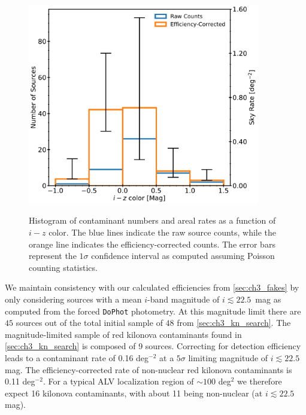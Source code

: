 \begin{figure}[!t]
\begin{center}
\hspace*{-0.1in}
\scalebox{1.}
{\includegraphics[width=0.9\textwidth]{./figs/chapter3/f8.pdf}}
\caption{Histogram of contaminant numbers and areal rates as a function of $i-z$ color. The blue lines indicate the raw source counts, while the orange line indicates the efficiency-corrected counts. The error bars represent the $1\sigma$ confidence interval as computed assuming Poisson counting statistics.}
\label{fig:ch3_color_dist_corr}
\end{center}
\end{figure}

\clearpage
We maintain consistency with our calculated efficiencies from \cref{sec:ch3_fakes} by only considering sources with a mean $i$-band magnitude of $i \lesssim 22.5$~mag as computed from the forced {\tt DoPhot} photometry. At this magnitude limit there are $45$ sources out of the total initial sample of $48$ from \cref{sec:ch3_kn_search}. The magnitude-limited sample of red kilonova contaminants found in \cref{sec:ch3_kn_search} is composed of 9 sources. Correcting for detection efficiency leads to a contaminant rate of 0.16 deg$^{-2}$ at a $5\sigma$ limiting magnitude of $i \lesssim 22.5$ mag. The efficiency-corrected rate of non-nuclear red kilonova contaminants is 0.11 deg$^{-2}$.  For a typical ALV localization region of $\sim 100$ deg$^2$ we therefore expect 16 kilonova contaminants, with about 11 being non-nuclear (at $i\lesssim 22.5$ mag).

